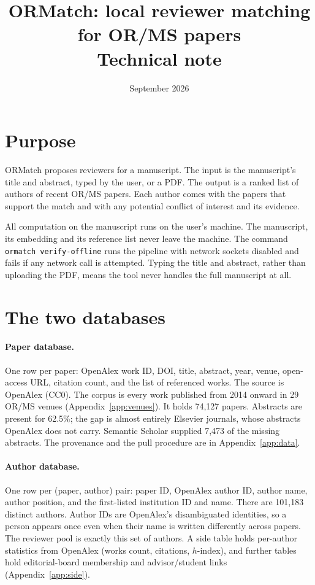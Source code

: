 \documentclass[11pt]{article}
\title{ORMatch: local reviewer matching for OR/MS papers\\[2pt]\large Technical note}
\author{}
\date{September 2026}
\begin{document}
\maketitle

\section{Purpose}
ORMatch proposes reviewers for a manuscript. The input is the manuscript's title and abstract, typed by the user, or a PDF. The output is a ranked list of authors of recent OR/MS papers. Each author comes with the papers that support the match and with any potential conflict of interest and its evidence.

All computation on the manuscript runs on the user's machine. The manuscript, its embedding and its reference list never leave the machine. The command \texttt{ormatch verify-offline} runs the pipeline with network sockets disabled and fails if any network call is attempted. Typing the title and abstract, rather than uploading the PDF, means the tool never handles the full manuscript at all.

\section{The two databases}
\paragraph{Paper database.} One row per paper: OpenAlex work ID, DOI, title, abstract, year, venue, open-access URL, citation count, and the list of referenced works. The source is OpenAlex (CC0). The corpus is every work published from 2014 onward in 29 OR/MS venues (Appendix~\ref{app:venues}). It holds 74{,}127 papers. Abstracts are present for 62.5\%; the gap is almost entirely Elsevier journals, whose abstracts OpenAlex does not carry. Semantic Scholar supplied 7{,}473 of the missing abstracts. The provenance and the pull procedure are in Appendix~\ref{app:data}.

\paragraph{Author database.} One row per (paper, author) pair: paper ID, OpenAlex author ID, author name, author position, and the first-listed institution ID and name. There are 101{,}183 distinct authors. Author IDs are OpenAlex's disambiguated identities, so a person appears once even when their name is written differently across papers. The reviewer pool is exactly this set of authors. A side table holds per-author statistics from OpenAlex (works count, citations, $h$-index), and further tables hold editorial-board membership and advisor/student links (Appendix~\ref{app:side}).
\end{document}
